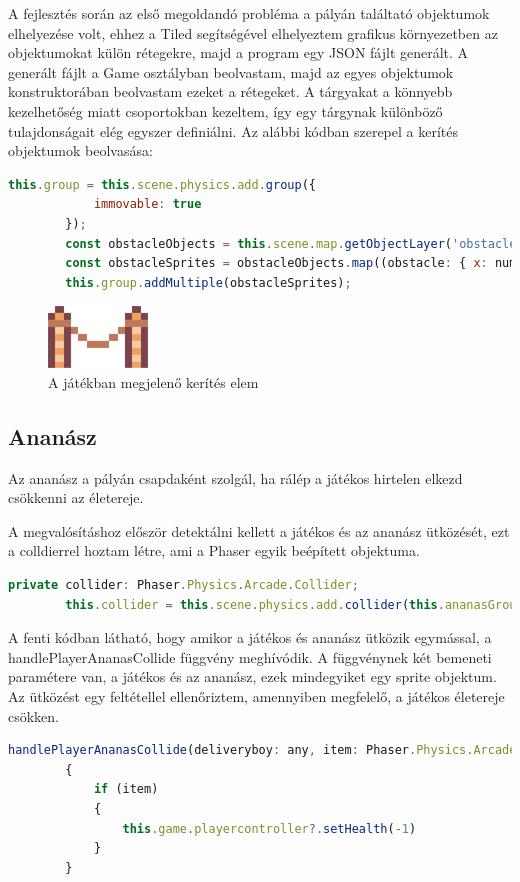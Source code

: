\documentclass[12pt, a4paper]{report}
\theoremstyle{definition}
\begin{document}
	A fejlesztés során az első megoldandó probléma a pályán találtató objektumok elhelyezése volt, ehhez a Tiled segítségével elhelyeztem grafikus környezetben az objektumokat külön rétegekre, majd a program egy JSON fájlt generált. A generált fájlt a Game osztályban beolvastam, majd az egyes objektumok konstruktorában beolvastam ezeket a rétegeket.
	A tárgyakat a könnyebb kezelhetőség miatt csoportokban kezeltem, így egy tárgynak különböző tulajdonságait elég egyszer definiálni. 
	Az alábbi kódban szerepel a kerítés objektumok beolvasása:
	\begin{lstlisting}[language=JavaScript]
		this.group = this.scene.physics.add.group({
			immovable: true
		});
		const obstacleObjects = this.scene.map.getObjectLayer('obstacle').objects;
		const obstacleSprites = obstacleObjects.map((obstacle: { x: number; y: number; }) => this.scene.physics.add.sprite(obstacle.x, obstacle.y, 'obstacle'));
		this.group.addMultiple(obstacleSprites);
	\end{lstlisting}
		\begin{figure}[!h]
			\centering
			\includegraphics[width=0.2\linewidth]{./images/obstacle.png}
			\caption{A játékban megjelenő kerítés elem}
			\label{fig:kerites}
		\end{figure}
	\subsection{Ananász}
	Az ananász a pályán csapdaként szolgál, ha rálép a játékos hirtelen elkezd csökkenni az életereje.
	
	A megvalósításhoz először detektálni kellett a játékos és az ananász ütközését, ezt a colldierrel hoztam létre, ami a Phaser egyik beépített objektuma.
	
	\begin{lstlisting}[language=JavaScript]
		private collider: Phaser.Physics.Arcade.Collider;
		this.collider = this.scene.physics.add.collider(this.ananasGroup,this.deliveryboy,this.handlePlayerAnanasCollide, undefined, this)
	\end{lstlisting}
	A fenti kódban látható, hogy amikor a játékos és ananász ütközik egymással, a handlePlayerAnanasCollide függvény meghívódik. A függvénynek két bemeneti paramétere van, a játékos és az ananász, ezek mindegyiket egy sprite objektum. Az ütközést egy feltétellel ellenőriztem, amennyiben megfelelő, a játékos életereje csökken.
	\begin{lstlisting}[language=JavaScript]
		handlePlayerAnanasCollide(deliveryboy: any, item: Phaser.Physics.Arcade.Sprite | undefined | Phaser.GameObjects.GameObject)
		{
			if (item)
			{   
				this.game.playercontroller?.setHealth(-1)
			}
		}
	\end{lstlisting}
\end{document}
